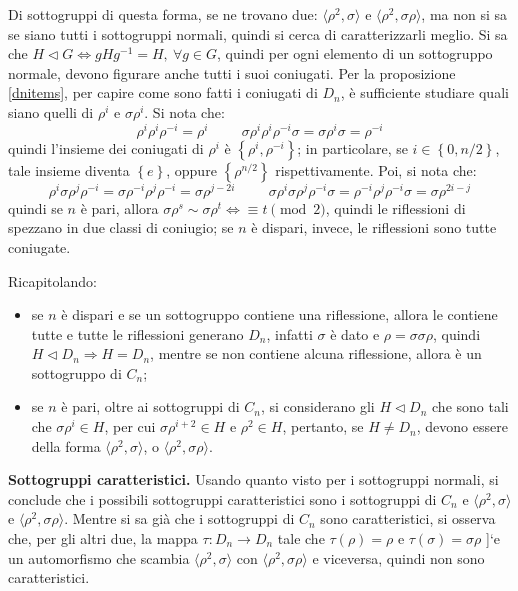 \documentclass[11pt]{scrartcl}
\theoremstyle{style1}
\numberwithin{equation}{subsection}
\renewcommand{\textbf}[1]{\textsf{\bfseries #1}}
\begin{document}
Di sottogruppi di questa forma, se ne trovano due: $\langle \rho ^2 , \sigma  \rangle$ e $\langle \rho ^2 , \sigma \rho  \rangle$, ma non si sa se siano tutti i sottogruppi normali, quindi si cerca di caratterizzarli meglio.
Si sa che $H \lhd G \iff gHg^{-1}= H , \ \forall g \in G$, quindi per ogni elemento di un sottogruppo normale, devono figurare anche tutti i suoi coniugati.
Per la proposizione \ref{dnitems}, per capire come sono fatti i coniugati di $D_n$, \`e sufficiente studiare quali siano quelli di $\rho ^i$ e $\sigma \rho ^i$. 
Si nota che:
\[
\rho ^i \rho ^i \rho ^{-i}= \rho ^i \hspace{1cm}\sigma \rho ^i \rho ^i \rho ^{-i}\sigma  = \sigma \rho ^i\sigma =\rho ^{-i}
\] 
quindi l'insieme dei coniugati di $\rho ^i$ \`e $\left\{ \rho ^i, \rho ^{-i} \right\} $; in particolare, se $i \in \left\{ 0 , n /2 \right\} $, tale insieme diventa $\left\{ e \right\} $, oppure $\left\{ \rho ^{ n / 2}  \right\} $ rispettivamente.
Poi, si nota che:
\[
\rho ^i \sigma \rho ^j \rho ^{-i}= \sigma \rho ^{-i}\rho ^j\rho ^{-i}=\sigma \rho ^{j-2i} \hspace{1cm} \sigma \rho ^i\sigma \rho ^j \rho ^{-i} \sigma = \rho ^{-i}\rho ^j\rho ^{-i}\sigma =\sigma \rho ^{2i-j} 
\] 
quindi se $n$ \`e pari, allora $\sigma \rho ^s \sim \sigma \rho ^t\iff  \equiv t \pmod{2} $, quindi le riflessioni di spezzano in due classi di coniugio; se $n$ \`e dispari, invece, le riflessioni sono tutte coniugate.

Ricapitolando: 
\begin{itemize}
	\item se $n$ \`e dispari e se un sottogruppo contiene una riflessione, allora le contiene tutte e tutte le riflessioni generano $D_n$, infatti $\sigma $ \`e dato e $\rho  = \sigma \sigma \rho $, quindi $H \lhd D_n \Rightarrow H = D_n$, mentre se non contiene alcuna riflessione, allora \`e un sottogruppo di $C_n$;
	\item se $n$ \`e pari, oltre ai sottogruppi di $C_n$, si considerano gli $H\lhd D_n$ che sono tali che $\sigma \rho ^i \in H$, per cui $\sigma \rho ^{i+2} \in H$ e $\rho ^2 \in H$, pertanto, se $H \neq D_n$, devono essere della forma $\langle \rho ^2,\sigma  \rangle$, o $\langle \rho ^2,\sigma \rho  \rangle$.
\end{itemize}

\textbf{Sottogruppi caratteristici.}
Usando quanto visto per i sottogruppi normali, si conclude che i possibili sottogruppi caratteristici sono i sottogruppi di $C_n$ e $\langle \rho ^2,\sigma  \rangle$ e $\langle \rho ^2 , \sigma \rho  \rangle$. 
Mentre si sa gi\`a che i sottogruppi di $C_n$ sono caratteristici, si osserva che, per gli altri due, la mappa $\tau : D_n \to D_n$ tale che $\tau (\rho ) = \rho $ e $\tau (\sigma ) = \sigma \rho $ ]`e un automorfismo che scambia $\langle \rho ^2,\sigma  \rangle$ con $\langle \rho ^2, \sigma \rho  \rangle$ e viceversa, quindi non sono caratteristici.
\end{document}
